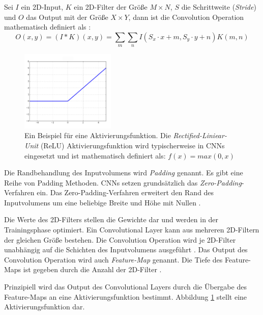Sei $I$ ein 2D-Input, $K$ ein 2D-Filter der Größe $M \times N$, $S$ die Schrittweite (\textit{Stride}) und $O$ das Output mit der Größe $X \times Y$, dann ist die Convolution Operation mathematisch definiert als \cite{goodfellowDeepLearning2016}:
\begin{equation}
	\label{eq:convolution}
	O(x,y) = (I * K)(x,y) = \sum_{m}\sum_{n}I(S_x \cdot x+m, S_y \cdot y+n)K(m,n)
\end{equation}
\begin{figure}
	\centering
	\includegraphics[width=0.4\textwidth]{images/ann_conv/ReLU.png}
	\caption{Ein Beispiel für eine Aktivierungsfunktion. Die \textit{Rectified-Liniear-Unit} (ReLU) Aktivierungsfunktion wird typischerweise in CNNs eingesetzt und ist mathematisch definiert als: $f(x) = max(0,x)$ \cite{goodfellowDeepLearning2016} }
	\label{fig:relu}
\end{figure}

Die Randbehandlung des Inputvolumens wird \textit{Padding} genannt. Es gibt eine Reihe von Padding Methoden. CNNs setzen grundsätzlich das \textit{Zero-Padding}-Verfahren ein. Das Zero-Padding-Verfahren erweitert den Rand des Inputvolumens um eine beliebige Breite und Höhe mit Nullen \cite{johnsonCS231nConvolutionalNeurala}. 

Die Werte des 2D-Filters stellen die Gewichte dar und werden in der Trainingsphase optimiert. Ein Convolutional Layer kann aus mehreren 2D-Filtern der gleichen Größe bestehen. Die Convolution Operation wird je 2D-Filter unabhängig auf die Schichten des Inputvolumens ausgeführt \cite{johnsonCS231nConvolutionalNeurala}. Das Output des Convolution Operation wird auch \textit{Feature-Map} genannt. Die Tiefe des Feature-Maps ist gegeben durch die Anzahl der 2D-Filter \cite{yamashitaConvolutionalNeuralNetworks2018}.

Prinzipiell wird das Output des Convolutional Layers durch die Übergabe des Feature-Maps an eine Aktivierungsfunktion bestimmt. Abbildung \ref{fig:relu} stellt eine Aktivierungsfunktion dar.

